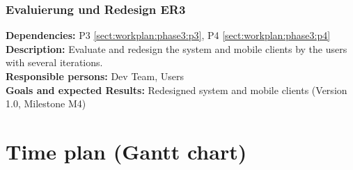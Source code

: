 \documentclass[a4paper,11pt]{article}
\begin{document}
\subsubsection{Evaluierung und Redesign ER3}
\label{sect:workplan:phase3:er3}
\textbf{Dependencies:} P3 \ref{sect:workplan:phase3:p3}, P4 \ref{sect:workplan:phase3:p4}\\
\textbf{Description:} Evaluate and redesign the system and mobile clients by the users with several iterations.\\
\textbf{Responsible persons:} Dev Team, Users\\
\textbf{Goals and expected Results:} Redesigned system and mobile clients (Version 1.0, Milestone M4)\\


\section{Time plan (Gantt chart)}
\label{sect:timeplan}
\end{document}
